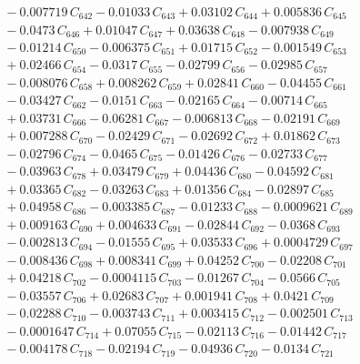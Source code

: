 \documentclass[a4paper,11pt]{article}
\begin{document}
\begin{align}
&\quad - 0.007719\,C_{642} - 0.01033\,C_{643} + 0.03102\,C_{644} + 0.005836\,C_{645} \nonumber\\
&\quad - 0.0473\,C_{646} + 0.01047\,C_{647} + 0.03638\,C_{648} - 0.007938\,C_{649} \nonumber\\
&\quad - 0.01214\,C_{650} - 0.006375\,C_{651} + 0.01715\,C_{652} - 0.001549\,C_{653} \nonumber\\
&\quad + 0.02466\,C_{654} - 0.0317\,C_{655} - 0.02799\,C_{656} - 0.02985\,C_{657} \nonumber\\
&\quad - 0.008076\,C_{658} + 0.008262\,C_{659} + 0.02841\,C_{660} - 0.04455\,C_{661} \nonumber\\
&\quad - 0.03427\,C_{662} - 0.0151\,C_{663} - 0.02165\,C_{664} - 0.00714\,C_{665} \nonumber\\
&\quad + 0.03731\,C_{666} - 0.06281\,C_{667} - 0.006813\,C_{668} - 0.02191\,C_{669} \nonumber\\
&\quad + 0.007288\,C_{670} - 0.02429\,C_{671} - 0.02692\,C_{672} + 0.01862\,C_{673} \nonumber\\
&\quad - 0.02796\,C_{674} - 0.0465\,C_{675} - 0.01426\,C_{676} - 0.02733\,C_{677} \nonumber\\
&\quad - 0.03963\,C_{678} + 0.03479\,C_{679} + 0.04436\,C_{680} - 0.04592\,C_{681} \nonumber\\
&\quad + 0.03365\,C_{682} - 0.03263\,C_{683} + 0.01356\,C_{684} - 0.02897\,C_{685} \nonumber\\
&\quad + 0.04958\,C_{686} - 0.003385\,C_{687} - 0.01233\,C_{688} - 0.0009621\,C_{689} \nonumber\\
&\quad + 0.009163\,C_{690} + 0.004633\,C_{691} - 0.02844\,C_{692} - 0.0368\,C_{693} \nonumber\\
&\quad - 0.002813\,C_{694} - 0.01555\,C_{695} + 0.03533\,C_{696} + 0.0004729\,C_{697} \nonumber\\
&\quad - 0.008436\,C_{698} + 0.008341\,C_{699} + 0.04252\,C_{700} - 0.02208\,C_{701} \nonumber\\
&\quad + 0.04218\,C_{702} - 0.0004115\,C_{703} - 0.01267\,C_{704} - 0.0566\,C_{705} \nonumber\\
&\quad - 0.03557\,C_{706} + 0.02683\,C_{707} + 0.001941\,C_{708} + 0.0421\,C_{709} \nonumber\\
&\quad - 0.02288\,C_{710} - 0.003743\,C_{711} + 0.003415\,C_{712} - 0.002501\,C_{713} \nonumber\\
&\quad - 0.0001647\,C_{714} + 0.07055\,C_{715} - 0.02113\,C_{716} - 0.01442\,C_{717} \nonumber\\
&\quad - 0.004178\,C_{718} - 0.02194\,C_{719} - 0.04936\,C_{720} - 0.0134\,C_{721} \nonumber\\

\end{align}
\end{document}
